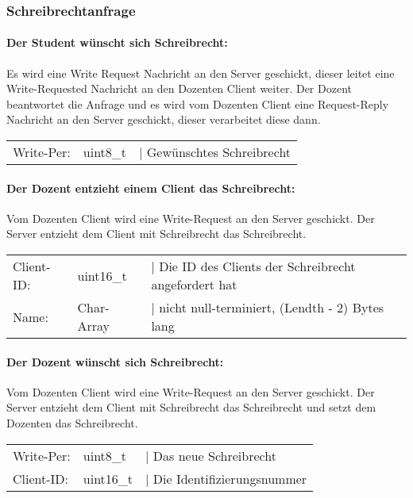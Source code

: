
\subsubsection{Schreibrechtanfrage}
\paragraph*{Der Student wünscht sich Schreibrecht: \\}
Es wird eine Write Request Nachricht an den Server geschickt, dieser leitet eine Write-Requested 
Nachricht an den Dozenten Client weiter. Der Dozent beantwortet die Anfrage und es wird vom Dozenten 
Client eine Request-Reply Nachricht an den Server geschickt, dieser verarbeitet diese dann.

\begin{tabular}{lll}
Write-Per: & uint8\_t & | Gewünschtes Schreibrecht
\end{tabular}

\paragraph*{Der Dozent entzieht einem Client das Schreibrecht: \\}
Vom Dozenten Client wird eine Write-Request an den Server geschickt. Der Server entzieht dem Client 
mit Schreibrecht das Schreibrecht.

\begin{tabular}{lll}
Client-ID: & uint16\_t & | Die ID des Clients der Schreibrecht angefordert hat \\
Name: & Char-Array & | nicht null-terminiert, (Lendth - 2) Bytes lang
\end{tabular}

\paragraph*{Der Dozent wünscht sich Schreibrecht: \\}
Vom Dozenten Client wird eine Write-Request an den Server geschickt. Der Server entzieht dem Client 
mit Schreibrecht das Schreibrecht und setzt dem Dozenten das Schreibrecht. 

\begin{tabular}{lll}
Write-Per: & uint8\_t & | Das neue Schreibrecht\\
Client-ID: & uint16\_t & | Die Identifizierungsnummer
\end{tabular}

